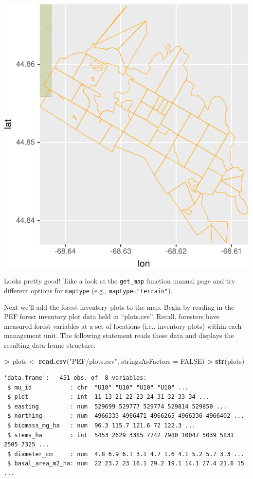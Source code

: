 \documentclass[]{krantz}
\makeatletter
\newenvironment{Shaded}{\begin{snugshade}}{\end{snugshade}}
\newcommand{\DataTypeTok}[1]{\textcolor[rgb]{0.27,0.27,0.27}{#1}}
\newcommand{\KeywordTok}[1]{\textcolor[rgb]{0.27,0.27,0.27}{\textbf{#1}}}
\newcommand{\NormalTok}[1]{#1}
\newcommand{\OperatorTok}[1]{\textcolor[rgb]{0.43,0.43,0.43}{\textbf{#1}}}
\newcommand{\OtherTok}[1]{\textcolor[rgb]{0.37,0.37,0.37}{#1}}
\newcommand{\StringTok}[1]{\textcolor[rgb]{0.5,0.5,0.5}{#1}}
\newenvironment{kframe}{%
\medskip{}
\setlength{\fboxsep}{.8em}
 \def\at@end@of@kframe{}%
 \ifinner\ifhmode%
  \def\at@end@of@kframe{\end{minipage}}%
  \begin{minipage}{\columnwidth}%
 \fi\fi%
 \def\FrameCommand##1{\hskip\@totalleftmargin \hskip-\fboxsep
 \colorbox{shadecolor}{##1}\hskip-\fboxsep
     \hskip-\linewidth \hskip-\@totalleftmargin \hskip\columnwidth}%
 \MakeFramed {\advance\hsize-\width
   \@totalleftmargin\z@ \linewidth\hsize
   \@setminipage}}%
 {\par\unskip\endMakeFramed%
 \at@end@of@kframe}
\renewenvironment{Shaded}{\begin{kframe}}{\end{kframe}}
\makeatother
\begin{document}
\includegraphics{bookdown_files/figure-latex/unnamed-chunk-186-1.pdf}

Looks pretty good! Take a look at the \texttt{get\_map} function manual page and try different options for \texttt{maptype} (e.g., \texttt{maptype="terrain"}).

Next we'll add the forest inventory plots to the map. Begin by reading in the PEF forest inventory plot data held in ``plots.csv''. Recall, foresters have measured forest variables at a set of locations (i.e., inventory plots) within each management unit. The following statement reads these data and displays the resulting data frame structure.

\begin{Shaded}
\begin{Highlighting}[]
\OperatorTok{>}\StringTok{ }\NormalTok{plots <-}\StringTok{ }\KeywordTok{read.csv}\NormalTok{(}\StringTok{"PEF/plots.csv"}\NormalTok{, }\DataTypeTok{stringsAsFactors =} \OtherTok{FALSE}\NormalTok{)}
\OperatorTok{>}\StringTok{ }\KeywordTok{str}\NormalTok{(plots)}
\end{Highlighting}
\end{Shaded}

\begin{verbatim}
'data.frame':   451 obs. of  8 variables:
 $ mu_id           : chr  "U10" "U10" "U10" "U10" ...
 $ plot            : int  11 13 21 22 23 24 31 32 33 34 ...
 $ easting         : num  529699 529777 529774 529814 529850 ...
 $ northing        : num  4966333 4966471 4966265 4966336 4966402 ...
 $ biomass_mg_ha   : num  96.3 115.7 121.6 72 122.3 ...
 $ stems_ha        : int  5453 2629 3385 7742 7980 10047 5039 5831 2505 7325 ...
 $ diameter_cm     : num  4.8 6.9 6.1 3.1 4.7 1.6 4.1 5.2 5.7 3.3 ...
 $ basal_area_m2_ha: num  22 23.2 23 16.1 29.2 19.1 14.1 27.4 21.6 15 ...
\end{verbatim}
\end{document}
